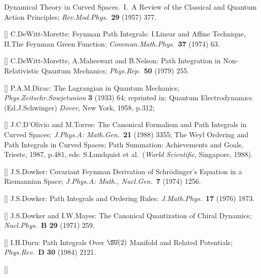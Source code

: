 Dynamical Theory in Curved Spaces.\ I.\ A Review of the Classical and
Quantum Action Principles;
{\it Rev.Mod.Phys.}\ {\bf 29} (1957) 377.
\item{[\DEWMa]}
C.DeWitt-Morette:
Feynman Path Integrals: I.Linear and Affine Technique,
II.The Feynman Green Function;
{\it Commun.Math.Phys.}\ {\bf 37} (1974) 63.
\item{[\DEWMNb]}
C.DeWitt-Morette, A.Maheswari and B.Nelson:
Path Integration in Non-Relativistic Quantum Mechanics;
{\it Phys.Rep.}\ {\bf 50} (1979) 255.
\item{[\DIRd]}
P.A.M.Dirac:
The Lagrangian in Quantum Mechanics;
{\it Phys.Zeitschr.Sowjetunion} {\bf 3} (1933) 64;
reprinted in: Quantum Electrodynamics (Ed.J.Schwinger)
{\it Dover}, New York, 1958, p.312;
\item{[\DOTO]}
J.C.D'Olivio and M.Torres:
The Canonical Formalism and Path Integrals in Curved Spaces;
{\it J.Phys.A: Math.Gen.}\ {\bf 21} (1988) 3355;
The Weyl Ordering and Path Integrals in Curved Spaces;
Path Summation: Achievements and Goals, Trieste, 1987, p.481,
eds: S.Lundquist et al.\ ({\it World Scientific}, Singapore, 1988).
\item{[\DOWc]}
J.S.Dowker:
Covariant Feynman Derivation of Schr\"odinger's Equation in a
Riemannian Space;
{\it J.Phys.A: Math., Nucl.Gen.}\ {\bf 7} (1974) 1256.
\item{[\DOWd]}
J.S.Dowker:
Path Integrals and Ordering Rules:
{\it J.Math.Phys.}\ {\bf 17} (1976) 1873.
\item{[\DMa]}
J.S.Dowker and I.W.Mayes:
The Canonical Quantization of Chiral Dynamics;
{\it Nucl.Phys.}\ {\bf B 29} (1971) 259.
\item{[\DURb]}
I.H.Duru:
Path Integrals Over $\SU(2)$ Manifold and Related Potentials;
{\it Phys.Rev.}\ {\bf D 30} (1984) 2121.
\item{[\DURd]}
